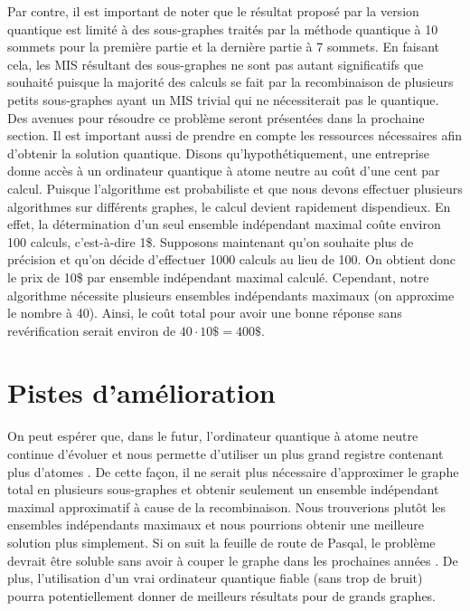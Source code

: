\documentclass[11pt]{article}
\begin{document}
Par contre, il est important de noter que le résultat proposé par la version quantique est limité à des sous-graphes traités par la méthode quantique à 10 sommets pour la première partie et la dernière partie à 7 sommets. En faisant cela, les MIS résultant des sous-graphes ne sont pas autant significatifs que souhaité puisque la majorité des calculs se fait par la recombinaison de plusieurs petits sous-graphes ayant un MIS trivial qui ne nécessiterait pas le quantique. Des avenues pour résoudre ce problème seront présentées dans la prochaine section. Il est important aussi de prendre en compte les ressources nécessaires afin d'obtenir la solution quantique. Disons qu'hypothétiquement, une entreprise donne accès à un ordinateur quantique à atome neutre au coût d'une cent par calcul. Puisque l'algorithme est probabiliste et que nous devons effectuer plusieurs algorithmes sur différents graphes, le calcul devient rapidement dispendieux. En effet, la détermination d'un seul ensemble indépendant maximal coûte environ 100 calculs, c'est-à-dire 1\$. Supposons maintenant qu'on souhaite plus de précision et qu'on décide d'effectuer 1000 calculs au lieu de 100. On obtient donc le prix de 10\$ par ensemble indépendant maximal calculé. Cependant, notre algorithme nécessite plusieurs ensembles indépendants maximaux (on approxime le nombre à 40). Ainsi, le coût total pour avoir une bonne réponse sans revérification serait environ de $40\cdot10\$ = 400\$$. 


\section{Pistes d'amélioration}

On peut espérer que, dans le futur, l'ordinateur quantique à atome neutre continue d'évoluer et nous permette d'utiliser un plus grand registre contenant plus d'atomes \cite{noauthor_pasqal_nodate}. De cette façon, il ne serait plus nécessaire d'approximer le graphe total en plusieurs sous-graphes et obtenir seulement un ensemble indépendant maximal approximatif à cause de la recombinaison. Nous trouverions plutôt les ensembles indépendants maximaux et nous pourrions obtenir une meilleure solution plus simplement. Si on suit la feuille de route de Pasqal, le problème devrait être soluble sans avoir à couper le graphe dans les prochaines années \cite{noauthor_our_nodate}. De plus, l'utilisation d'un vrai ordinateur quantique fiable (sans trop de bruit) pourra potentiellement donner de meilleurs résultats pour de grands graphes.
\end{document}
